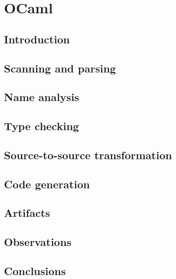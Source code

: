 \section{OCaml}

\subsection{Introduction}

\subsection{Scanning and parsing}

\subsection{Name analysis}

\subsection{Type checking}

\subsection{Source-to-source transformation}

\subsection{Code generation}

\subsection{Artifacts}

\subsection{Observations}

\subsection{Conclusions}
